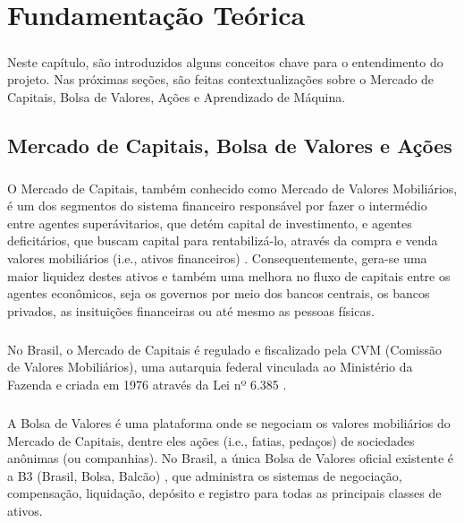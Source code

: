 \chapter{Fundamentação Teórica}
\label{cap2}

\paragraph{} Neste capítulo, são introduzidos alguns conceitos chave para o entendimento do projeto. Nas próximas seções, são feitas contextualizações sobre o Mercado de Capitais, Bolsa de Valores, Ações e Aprendizado de Máquina.



\section{Mercado de Capitais, Bolsa de Valores e Ações}

\paragraph{} O Mercado de Capitais, também conhecido como Mercado de Valores Mobiliários, é um dos segmentos do sistema financeiro responsável por fazer o intermédio entre agentes superávitarios, que detém capital de investimento, e agentes deficitários, que buscam capital para rentabilizá-lo, através da compra e venda valores mobiliários (i.e., ativos financeiros) \cite{mercado_de_capitais}. Consequentemente, gera-se uma maior liquidez destes ativos e também uma melhora no fluxo de capitais entre os agentes econômicos, seja os governos por meio dos bancos centrais, os bancos privados, as insituições financeiras ou até mesmo as pessoas físicas.

\paragraph{} No Brasil, o Mercado de Capitais é regulado e fiscalizado pela CVM (Comissão de Valores Mobiliários), uma autarquia federal vinculada ao Ministério da Fazenda e criada em 1976 através da Lei nº 6.385 \cite{lei_6385}.

\paragraph{} A Bolsa de Valores é uma plataforma onde se negociam os valores mobiliários do Mercado de Capitais, dentre eles ações (i.e., fatias, pedaços) de sociedades anônimas (ou companhias). No Brasil, a única Bolsa de Valores oficial existente é a B3 (Brasil, Bolsa, Balcão) \cite{b3}, que administra os sistemas de negociação, compensação, liquidação, depósito e registro para todas as principais classes de ativos.

